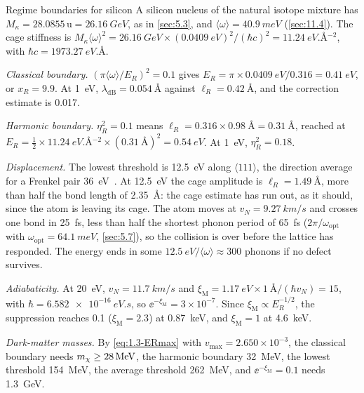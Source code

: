 \begin{workedexample}{Regime boundaries for silicon}\label{we:19-boundary}
A silicon nucleus of the natural isotope mixture has $M_\kappa = 28.0855\,\mathrm{u} = \SI{26.16}{GeV}$, as in \cref{sec:5.3}, and $\langle\omega\rangle = \SI{40.9}{meV}$ (\cref{sec:11.4}). The cage stiffness is $M_\kappa\langle\omega\rangle^2 = \SI{26.16}{GeV}\times(\SI{0.0409}{eV})^2/(\hbar c)^2 = \SI{11.24}{eV.\angstrom^{-2}}$, with $\hbar c = \SI{1973.27}{eV.\angstrom}$.

\emph{Classical boundary.} $(\pi\langle\omega\rangle/E_R)^2 = 0.1$ gives $E_R = \pi\times\SI{0.0409}{eV}/0.316 = \SI{0.41}{eV}$, or $x_R = 9.9$. At \SI{1}{eV}, $\lambda_{\mathrm{dB}} = \SI{0.054}{\angstrom}$ against $\ell_R = \SI{0.42}{\angstrom}$, and the correction estimate is 0.017.

\emph{Harmonic boundary.} $\eta_R^2 = 0.1$ means $\ell_R = 0.316\times\SI{0.98}{\angstrom} = \SI{0.31}{\angstrom}$, reached at $E_R = \tfrac12\times\SI{11.24}{eV.\angstrom^{-2}}\times(\SI{0.31}{\angstrom})^2 = \SI{0.54}{eV}$. At \SI{1}{eV}, $\eta_R^2 = 0.18$.

\emph{Displacement.} The lowest threshold is \SI{12.5}{eV} along $\langle111\rangle$, the direction average for a Frenkel pair \SI{36}{eV}~\cite[Table~IV]{holmstrom2008threshold}. At \SI{12.5}{eV} the cage amplitude is $\ell_R = \SI{1.49}{\angstrom}$, more than half the bond length of \SI{2.35}{\angstrom}: the cage estimate has run out, as it should, since the atom is leaving its cage. The atom moves at $v_N = \SI{9.27}{km/s}$ and crosses one bond in \SI{25}{fs}, less than half the shortest phonon period of \SI{65}{fs} ($2\pi/\omega_{\mathrm{opt}}$ with $\omega_{\mathrm{opt}} = \SI{64.1}{meV}$, \cref{sec:5.7}), so the collision is over before the lattice has responded. The energy ends in some $\SI{12.5}{eV}/\langle\omega\rangle \approx 300$ phonons if no defect survives.

\emph{Adiabaticity.} At \SI{20}{eV}, $v_N = \SI{11.7}{km/s}$ and $\xi_{\mathrm{M}} = \SI{1.17}{eV}\times\SI{1}{\angstrom}/(\hbar v_N) = 15$, with $\hbar = \SI{6.582e-16}{eV.s}$, so $\ee^{-\xi_{\mathrm{M}}} = 3\times10^{-7}$. Since $\xi_{\mathrm{M}} \propto E_R^{-1/2}$, the suppression reaches 0.1 ($\xi_{\mathrm{M}} = 2.3$) at \SI{0.87}{keV}, and $\xi_{\mathrm{M}} = 1$ at \SI{4.6}{keV}.

\emph{Dark-matter masses.} By \cref{eq:1.3-ERmax} with $v_{\mathrm{max}} = 2.650\times10^{-3}$, the classical boundary needs $m_{\chi} \ge \SI{28}{MeV}$, the harmonic boundary \SI{32}{MeV}, the lowest threshold \SI{154}{MeV}, the average threshold \SI{262}{MeV}, and $\ee^{-\xi_{\mathrm{M}}} = 0.1$ needs \SI{1.3}{GeV}.
\end{workedexample}


